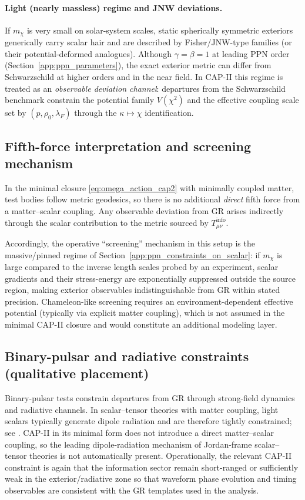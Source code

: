 \paragraph{Light (nearly massless) regime and JNW deviations.}
If $m_\chi$ is very small on solar-system scales, static spherically symmetric exteriors generically carry scalar hair and are described by Fisher/JNW-type families (or their potential-deformed analogues).
Although $\gamma=\beta=1$ at leading PPN order (Section~\ref{app:ppn_parameters}), the exact exterior metric can differ from Schwarzschild at higher orders and in the near field.
In CAP-II this regime is treated as an \emph{observable deviation channel}: departures from the Schwarzschild benchmark constrain the potential family $V(\chi^2)$ and the effective coupling scale set by $(p,\rho_0,\lambda_F)$ through the $\kappa\mapsto\chi$ identification.

\subsection{Fifth-force interpretation and screening mechanism}
\label{app:fifth_force_screening}

In the minimal closure \eqref{eq:omega_action_cap2} with minimally coupled matter, test bodies follow metric geodesics, so there is no additional \emph{direct} fifth force from a matter--scalar coupling.
Any observable deviation from GR arises indirectly through the scalar contribution to the metric sourced by $T^{\mathrm{info}}_{\mu\nu}$.
\par
\noindent Accordingly, the operative ``screening'' mechanism in this setup is the massive/pinned regime of Section~\ref{app:ppn_constraints_on_scalar}: if $m_\chi$ is large compared to the inverse length scales probed by an experiment, scalar gradients and their stress-energy are exponentially suppressed outside the source region, making exterior observables indistinguishable from GR within stated precision.
Chameleon-like screening requires an environment-dependent effective potential (typically via explicit matter coupling), which is not assumed in the minimal CAP-II closure and would constitute an additional modeling layer.

\subsection{Binary-pulsar and radiative constraints (qualitative placement)}
\label{app:binary_pulsar_constraints}

Binary-pulsar tests constrain departures from GR through strong-field dynamics and radiative channels.
In scalar--tensor theories with matter coupling, light scalars typically generate dipole radiation and are therefore tightly constrained; see \cite{Will2014}.
CAP-II in its minimal form does not introduce a direct matter--scalar coupling, so the leading dipole-radiation mechanism of Jordan-frame scalar--tensor theories is not automatically present.
Operationally, the relevant CAP-II constraint is again that the information sector remain short-ranged or sufficiently weak in the exterior/radiative zone so that waveform phase evolution and timing observables are consistent with the GR templates used in the analysis.


